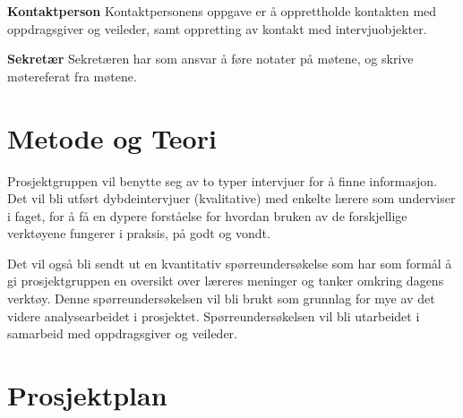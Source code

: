 \documentclass[norsk,a4paper,12pt]{article}
\begin{document}
\noindent\textbf{Kontaktperson}\newline
Kontaktpersonens oppgave er å opprettholde kontakten med oppdragsgiver og veileder, samt oppretting av  kontakt med intervjuobjekter.
\newline

\noindent\textbf{Sekretær}\newline
Sekretæren har som ansvar å føre notater på møtene, og skrive møtereferat fra møtene.


\section{Metode og Teori}

Prosjektgruppen vil benytte seg av to typer intervjuer for å finne informasjon. 
Det vil bli utført dybdeintervjuer (kvalitative) med enkelte lærere som underviser i faget, for å få en dypere forståelse for hvordan bruken av de forskjellige verktøyene fungerer i praksis, på godt og vondt.
\newline

Det vil også bli sendt ut en kvantitativ spørreundersøkelse som har som formål å gi prosjektgruppen en oversikt over læreres meninger og tanker omkring dagens verktøy. Denne spørreundersøkelsen vil bli brukt som grunnlag for mye av det videre analysearbeidet i prosjektet. Spørreundersøkelsen vil bli utarbeidet i samarbeid med oppdragsgiver og veileder.

\newpage

\section{Prosjektplan}
\end{document}
